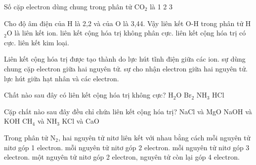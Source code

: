 \begin{ex}
Số cặp electron dùng chung trong phân tử CO$_2$ là
\choice
{1}
{2}
{}
{3}
\end{ex}

\begin{ex}
Cho độ âm điện của H là 2,2 và của O là 3,44. Vậy liên kết O-H trong phân tử H$_2$O là
\choice
{liên kết ion.}
{liên kết cộng hóa trị không phân cực.}
{\True liên kết cộng hóa trị có cực.}
{liên kết kim loại.}
\end{ex}

\begin{ex}
Liên kết cộng hóa trị được tạo thành do
\choice
{lực hút tĩnh điện giữa các ion.}
{\True sự dùng chung cặp electron giữa hai nguyên tử.}
{sự cho nhận electron giữa hai nguyên tử.}
{lực hút giữa hạt nhân và các electron.}
\end{ex}

\begin{ex}
Chất nào sau đây có liên kết cộng hóa trị không cực?
\choice
{H$_2$O}
{\True Br$_2$}
{NH$_3$}
{HCl}
\end{ex}

\begin{ex}
Cặp chất nào sau đây đều chỉ chứa liên kết cộng hóa trị?
\choice
{NaCl và MgO}
{NaOH và KOH}
{\True CH$_4$ và NH$_3$}
{KCl và CaO}
\end{ex}

\begin{ex}
Trong phân tử N$_2$, hai nguyên tử nitơ liên kết với nhau bằng cách
\choice
{mỗi nguyên tử nitơ góp 1 electron.}
{mỗi nguyên tử nitơ góp 2 electron.}
{\True mỗi nguyên tử nitơ góp 3 electron.}
{một nguyên tử nitơ góp 2 electron, nguyên tử còn lại góp 4 electron.}
\end{ex}

